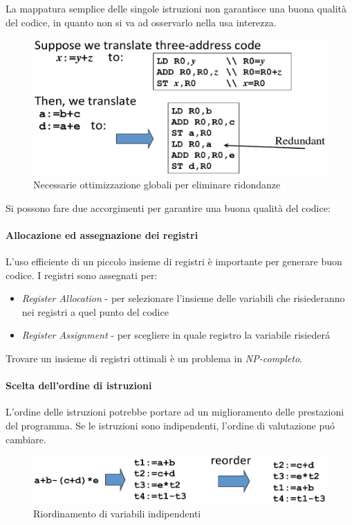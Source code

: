 La mappatura semplice delle singole istruzioni non garantisce una buona
qualit\`a del codice, in quanto non si va ad osservarlo nella usa interezza.

\begin{figure}[H]
  \centering
  \includegraphics[scale=0.35]{res/image/needed_global_optimization}
  \caption{Necessarie ottimizzazione globali per eliminare ridondanze}
  \label{img:needed_global_optimization}
\end{figure}

Si possono fare due accorgimenti per garantire una buona qualit\`a del codice:
\paragraph{Allocazione ed assegnazione dei registri}
L'uso efficiente di un piccolo insieme di registri \`e importante per generare
buon codice. I registri sono assegnati per:
\begin{itemize}
\item \textit{Register Allocation} - per selezionare l'insieme delle variabili
che risiederanno nei registri a quel punto del codice
\item \textit{Register Assignment} - per scegliere in quale registro la
variabile risieder\'a
\end{itemize}
Trovare un insieme di registri ottimali \`e un problema in
\textit{NP-completo}.
\paragraph{Scelta dell'ordine di istruzioni}
L'ordine delle istruzioni potrebbe portare ad un miglioramento delle
prestazioni del programma. Se le istruzioni sono indipendenti, l'ordine di
valutazione pu\'o cambiare.

\begin{figure}[H]
  \centering
  \includegraphics[scale=0.5]{res/image/reorder_variable}
  \caption{Riordinamento di variabili indipendenti}
  \label{img:reorder_variable}
\end{figure}

